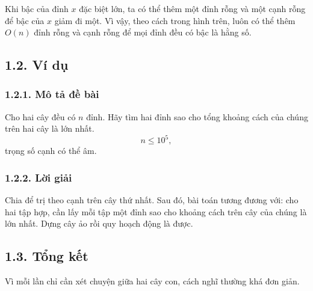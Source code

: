 \documentclass[11pt]{article}
\begin{document}
\begin{center}
\end{center}

Khi bậc của đỉnh \(x\) đặc biệt lớn, ta có thể thêm một đỉnh rỗng và một cạnh
rỗng để bậc của \(x\) giảm đi một. Vì vậy, theo cách trong hình trên, luôn có
thể thêm \(O(n)\) đỉnh rỗng và cạnh rỗng để mọi đỉnh đều có bậc là hằng số.

\subsection*{1.2. Ví dụ}

\subsubsection*{1.2.1. Mô tả đề bài}

Cho hai cây đều có \(n\) đỉnh. Hãy tìm hai đỉnh sao cho tổng khoảng cách của
chúng trên hai cây là lớn nhất.
\[
  n\le10^5,
\]
trọng số cạnh có thể âm.

\subsubsection*{1.2.2. Lời giải}

Chia để trị theo cạnh trên cây thứ nhất. Sau đó, bài toán tương đương với:
cho hai tập hợp, cần lấy mỗi tập một đỉnh sao cho khoảng cách trên cây của
chúng là lớn nhất. Dựng cây ảo rồi quy hoạch động là được.

\subsection*{1.3. Tổng kết}

Vì mỗi lần chỉ cần xét chuyện giữa hai cây con, cách nghĩ thường khá đơn giản.
\end{document}
